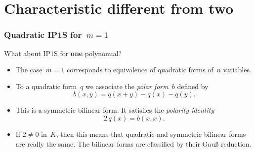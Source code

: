 \documentclass{beamer}%
\def\transpose{{}^{\mathrm{\scriptscriptstyle t}}\!}
\def\strong#1{{\bf\color{rouge}#1}}
\let\mathrm\mathsf
\begin{document}
\section{Characteristic different from two}
\begin{frame}\frametitle{Quadratic IP1S for~$m = 1$}%
What about IP1S for \strong{one} polynomial?
\begin{itemize}
\item The case~$m = 1$ corresponds to equivalence of quadratic forms of~$n$
variables.
\item To a quadratic form~$q$ we associate the \emph{polar form}~$b$
defined by
\begin{equation*}
b(x,y) = q(x+y) - q(x) - q(y).
\end{equation*}
\item This is a symmetric bilinear form. It satisfies the \emph{polarity
identity}
\begin{equation*}
2\,q(x) = b(x,x).
\end{equation*}
\item If $2 ≠ 0$ in~$K$, then this means that quadratic and symmetric
bilinear forms are really the same. The bilinear forms are classified by
their Gauß reduction.
\end{itemize}
\end{frame}%
\end{document}
